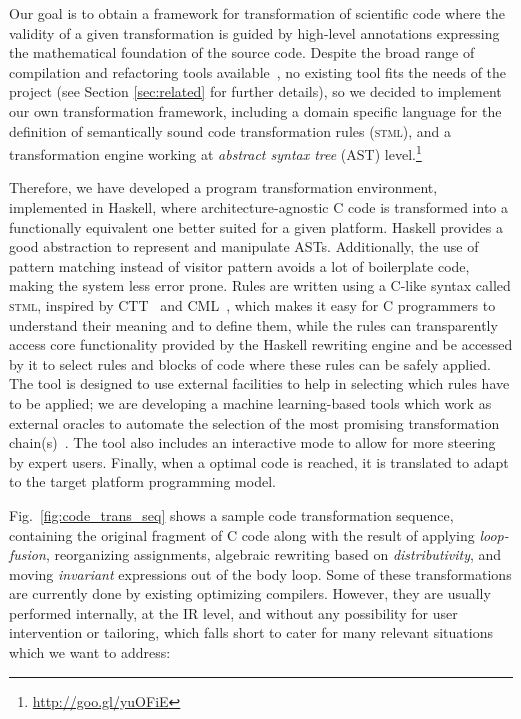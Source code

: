 \documentclass[svgnames,usenames,preprint,nocopyrightspace]{sigplanconf}
\newcommand{\stml}{\textsc{stml}\xspace}
\begin{document}
Our goal is to obtain a framework for transformation of scientific code where the validity of a
given transformation is guided by high-level annotations expressing
the mathematical foundation of the source code. 
Despite the broad range of compilation and refactoring tools
available~\cite{Bagge03CodeBoost,visser04:stratego-XT-0.9,Schupp2002}, 
no existing tool fits the needs of the project (see Section \ref{sec:related} for further details), 
so we decided to implement our own
transformation framework, including a domain specific language for the
definition of semantically sound code transformation rules (\stml), and
a transformation engine working at \emph{abstract syntax tree} (AST) 
level.\footnote{\url{http://goo.gl/yuOFiE}}

Therefore, we have developed a program transformation environment, implemented in
Haskell, where architecture-agnostic C code 
is transformed into a functionally equivalent one better
suited for a given platform.
Haskell provides a good abstraction to represent and manipulate ASTs. Additionally, the use of pattern matching instead of visitor pattern avoids a lot of boilerplate code, making the system less error prone. 
Rules are written using a C-like syntax called \stml, inspired by CTT~\cite{Boekhold1999} and 
CML~\cite{Brown2005-tr-opt_trans_hw}, which makes it
easy for C programmers to understand their meaning and to define them,
while the rules can transparently access core functionality provided
by the Haskell rewriting engine and be accessed by it to
select rules and blocks of code where these rules can be
safely applied.
The tool is designed to use external facilities to help in selecting
which rules have to be applied; we are developing a machine
learning-based tools which work as external oracles to automate the selection of the most promising transformation chain(s)~\cite{vigueras16:learning_code_trans}. 
The tool also includes an
interactive mode to allow for more steering by expert users.
Finally, when a optimal code is reached, it is translated to adapt to the target platform programming model. 


Fig.~\ref{fig:code_trans_seq} shows a sample code
transformation sequence,
containing the original fragment of C code along with the result of
applying \emph{loop-fusion}, reorganizing assignments, algebraic
rewriting based on \emph{distributivity}, and moving \emph{invariant}
expressions out of the body loop. Some of these transformations are
currently done by existing optimizing compilers.  However, they are
usually performed internally, at the IR level, and without any
possibility for user intervention or tailoring, which falls short to
cater for many relevant situations which we want to address:
\end{document}
